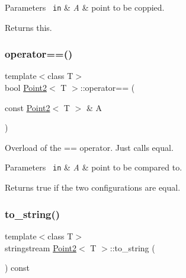 \begin{DoxyParams}[1]{Parameters}
\mbox{\texttt{ in}}  & {\em A} & point to be coppied. \\
\hline
\end{DoxyParams}
\begin{DoxyReturn}{Returns}
this. 
\end{DoxyReturn}
\mbox{\label{class_point2_af58b2b05b59316580b3989b0548afade}} 
\subsubsection{\texorpdfstring{operator==()}{operator==()}}
{\footnotesize\ttfamily template$<$class T$>$ \\
bool \mbox{\hyperlink{class_point2}{Point2}}$<$ T $>$\+::operator== (\begin{DoxyParamCaption}\item[{const \mbox{\hyperlink{class_point2}{Point2}}$<$ T $>$ \&}]{A }\end{DoxyParamCaption})\hspace{0.3cm}{\ttfamily [inline]}}



Overload of the == operator. Just calls {\ttfamily equal}. 


\begin{DoxyParams}[1]{Parameters}
\mbox{\texttt{ in}}  & {\em A} & point to be compared to. \\
\hline
\end{DoxyParams}
\begin{DoxyReturn}{Returns}
true if the two configurations are equal. 
\end{DoxyReturn}
\mbox{\label{class_point2_aa04082290a2f554060081beafd7d7e0d}} 
\subsubsection{\texorpdfstring{to\_string()}{to\_string()}}
{\footnotesize\ttfamily template$<$class T$>$ \\
stringstream \mbox{\hyperlink{class_point2}{Point2}}$<$ T $>$\+::to\+\_\+string (\begin{DoxyParamCaption}{ }\end{DoxyParamCaption}) const\hspace{0.3cm}{\ttfamily [inline]}}

